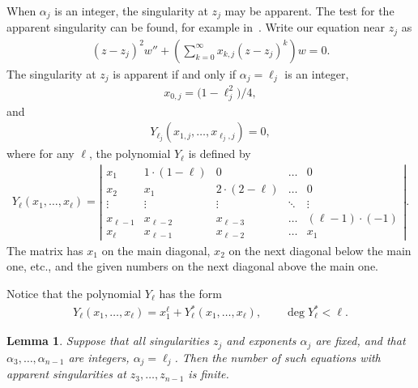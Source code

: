 \documentclass[11pt]{article}
\numberwithin{equation}{section}
\newtheorem{lem}[thm]{Lemma}
 { \theoremstyle{definition}
\newtheorem{Remark}[thm]{Remark} }
\def\lc{,\allowbreak\ldots,\allowbreak}
\begin{document}
When $\alpha_j$ is an integer, the singularity at $z_j$ may be apparent. The test for the apparent singularity can be found, for example in~\cite{TL}. Write our equation near $z_j$ as
\begin{gather*}
(z-z_j)^2w''+\left(\sum_{k=0}^\infty x_{k,j}(z-z_j)^k\right)w=0.
\end{gather*}
The singularity at $z_j$ is apparent if and only if
$\alpha_j=\ell_j$ is an integer,
\begin{gather*}
x_{0,j}=\big(1-\ell_j^2\big)/4,
\end{gather*}
and
\begin{gather}\label{app}
Y_{\ell_j}(x_{1,j}\lc x_{\ell_j,j})=0,
\end{gather}
where for any $\ell$, the polynomial $Y_\ell$ is defined by
\begin{gather*}
Y_{\ell}(x_1\lc x_\ell)=
\left|\begin{matrix}x_1&1\cdot(1-\ell)&0&\ldots&0\\
x_2&x_1&2\cdot(2-\ell)&\ldots&0\\
\vdots&\vdots&\vdots&\ddots&\vdots\\
x_{\ell-1}&x_{\ell-2}&x_{\ell-3}&\ldots&(\ell-1)\cdot(-1)\\
x_\ell&x_{\ell-1}&x_{\ell-2}&\ldots&x_1
\end{matrix}\right|.
\end{gather*}
The matrix has $x_1$ on the main diagonal, $x_2$ on the next diagonal below the main one, etc., and the given numbers on the next diagonal above the main one.

Notice that the polynomial $Y_{\ell}$ has the form
\begin{gather}\label{app2}
Y_\ell(x_1\lc x_\ell)=x_1^\ell+Y^*_\ell(x_1\lc x_\ell),\qquad \deg Y^*_\ell< \ell.
\end{gather}
\begin{lem}\label{lem1}
Suppose that all singularities $z_j$ and exponents $\alpha_j$ are fixed, and that $\alpha_3\lc\alpha_{n-1}$ are integers, $\alpha_j=\ell_j$. Then the number of such equations with apparent singularities at $z_3\lc z_{n-1}$ is finite.
\end{lem}
\end{document}
